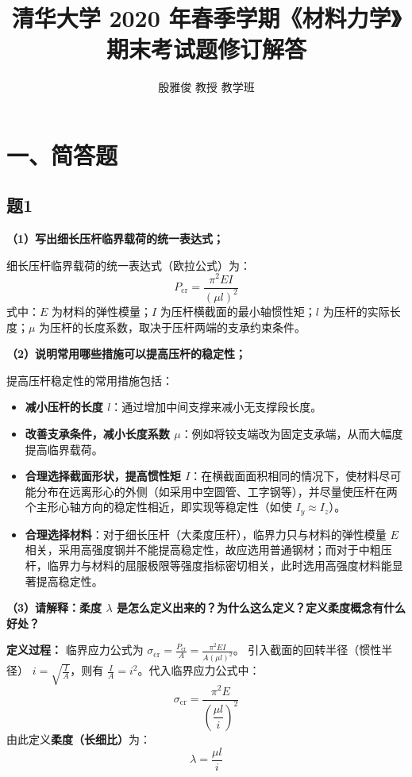 \documentclass[UTF8,fontset=windows]{ctexart}
\title{\vspace{-1.5cm}\textbf{清华大学 2020 年春季学期《材料力学》期末考试题修订解答}}
\author{殷雅俊 教授 教学班}
\date{}
\begin{document}
\maketitle
\vspace{-1.0cm}

\section*{一、简答题}

\subsection*{题1}
\textbf{（1）写出细长压杆临界载荷的统一表达式；}

细长压杆临界载荷的统一表达式（欧拉公式）为：
\[
    P_{\text{cr}} = \frac{\pi^2 EI}{(\mu l)^2}
\]
式中：$E$ 为材料的弹性模量；$I$ 为压杆横截面的最小轴惯性矩；$l$ 为压杆的实际长度；$\mu$ 为压杆的长度系数，取决于压杆两端的支承约束条件。

\textbf{（2）说明常用哪些措施可以提高压杆的稳定性；}

提高压杆稳定性的常用措施包括：
\begin{itemize}
    \item \textbf{减小压杆的长度 $l$}：通过增加中间支撑来减小无支撑段长度。
    \item \textbf{改善支承条件，减小长度系数 $\mu$}：例如将铰支端改为固定支承端，从而大幅度提高临界载荷。
    \item \textbf{合理选择截面形状，提高惯性矩 $I$}：在横截面面积相同的情况下，使材料尽可能分布在远离形心的外侧（如采用中空圆管、工字钢等），并尽量使压杆在两个主形心轴方向的稳定性相近，即实现等稳定性（如使 $I_y \approx I_z$）。
    \item \textbf{合理选择材料}：对于细长压杆（大柔度压杆），临界力只与材料的弹性模量 $E$ 相关，采用高强度钢并不能提高稳定性，故应选用普通钢材；而对于中粗压杆，临界力与材料的屈服极限等强度指标密切相关，此时选用高强度材料能显著提高稳定性。
\end{itemize}

\textbf{（3）请解释：柔度 $\lambda$ 是怎么定义出来的？为什么这么定义？定义柔度概念有什么好处？}

\textbf{定义过程：}
临界应力公式为 $\sigma_{\text{cr}} = \frac{P_{\text{cr}}}{A} = \frac{\pi^2 EI}{A(\mu l)^2}$。
引入截面的回转半径（惯性半径） $i = \sqrt{\frac{I}{A}}$，则有 $\frac{I}{A} = i^2$。代入临界应力公式中：
\[
    \sigma_{\text{cr}} = \frac{\pi^2 E}{\left(\dfrac{\mu l}{i}\right)^2}
\]
由此定义\textbf{柔度（长细比）}为：
\[
    \lambda = \frac{\mu l}{i}
\]
\end{document}
